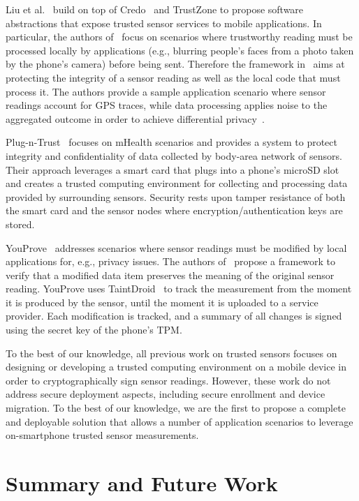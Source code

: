 Liu et al.~\cite{liu12mobisys} build on top of Credo~\cite{credo} and TrustZone
to propose software abstractions that expose trusted sensor services to mobile
applications. In particular, the authors of~\cite{liu12mobisys} focus on scenarios where
trustworthy reading must be processed locally by applications (e.g., blurring
people's faces from a photo taken by the phone's camera) before being
sent. Therefore the framework in~\cite{liu12mobisys} aims at protecting the
integrity of a sensor reading as well as the local code that must process it.
The authors provide a sample application scenario where sensor readings account
for GPS traces, while data processing applies noise to the aggregated outcome in
order to achieve differential privacy~\cite{dwork06icapl}.

Plug-n-Trust~\cite{sorber12mobisys} focuses on mHealth scenarios and provides a
system to protect integrity and confidentiality of data collected by body-area
network of sensors.  Their approach leverages a smart card that plugs into a
phone's microSD slot and creates a trusted computing environment for collecting
and processing data provided by surrounding sensors.  Security rests upon tamper
resistance of both the smart card and the sensor nodes where
encryption/authentication keys are stored.

YouProve~\cite{gilbert11sensys} addresses scenarios where sensor readings must
be modified by local applications for, e.g., privacy issues. The authors
of~\cite{gilbert11sensys} propose a framework to verify that a modified data
item preserves the meaning of the original sensor reading.  YouProve uses
TaintDroid~\cite{taintdroid} to track the measurement from the moment it is
produced by the sensor, until the moment it is uploaded to a service provider.
Each modification is tracked, and a summary of all changes is signed using the
secret key of the phone's TPM.

To the best of our knowledge, all previous work on trusted sensors focuses on
designing or developing a trusted computing environment on a mobile device in
order to cryptographically sign sensor readings. However, these work do not
address secure deployment aspects, including secure enrollment and device
migration. To the best of our knowledge, we are the first to propose a complete
and deployable solution that allows a number of application scenarios to
leverage on-smartphone trusted sensor measurements.

\section{Summary and Future Work}

